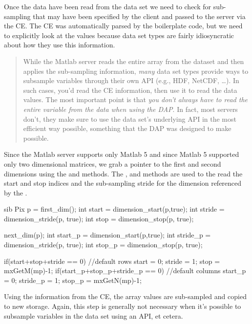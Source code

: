 \documentclass{dods-paper}
\begin{document}
Once the data have been read from the data set we need to check for
sub-sampling that may have been specified by the client and passed to the
server via the CE. The CE was automatically parsed by the boilerplate code,
but we need to explicitly look at the values because data set types are
fairly idiosyncratic about how they use this information.

\begin{quote}
While the Matlab server reads the entire array from the dataset and then
applies the sub-sampling information, \emph{many} data set types provide ways
to subsample variables through their own API (e.g., HDF, NetCDF, \ldots). In
such cases, you'd read the CE information, then use it to read the data
values. The most important point is that \emph{you don't always have to read
  the entire variable from the data when using the DAP}. In fact, most
servers don't, they make sure to use the data set's underlying API in the
most efficient way possible, something that the DAP was designed to make
possible.
\end{quote}

Since the Matlab server supports only Matlab 5 and since Matlab 5 supported
only two dimensional matrices, we grab a pointer to the first and second
dimensions using the  and 
methods. The ,  and
 methods are used to the read the start and stop
indices and the sub-sampling stride for the dimension referenced by the
 .

\begin{vcode}{sib}
    Pix p = first_dim();
    int start = dimension_start(p,true);
    int stride = dimension_stride(p, true);
    int stop = dimension_stop(p, true); 

    next_dim(p);
    int start_p = dimension_start(p,true);
    int stride_p = dimension_stride(p, true);
    int stop_p = dimension_stop(p, true); 

    if(start+stop+stride == 0){ //default rows
        start = 0;
        stride = 1;
        stop = mxGetM(mp)-1;
    }
    if(start_p+stop_p+stride_p == 0){ //default columns
        start_p = 0;
        stride_p = 1;
        stop_p = mxGetN(mp)-1;
    }
\end{vcode}

Using the information from the CE, the array values are sub-sampled and copied
to new storage. Again, this step is generally not necessary when it's
possible to subsample variables in the data set using an API, et cetera.
\end{document}
